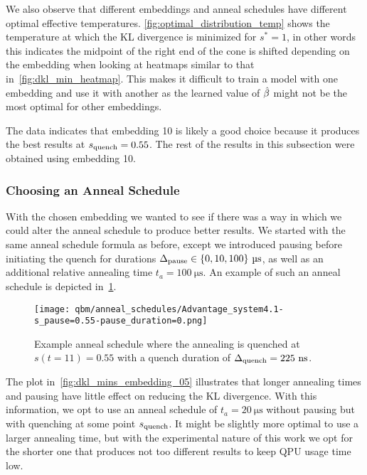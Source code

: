 We also observe that different embeddings and anneal schedules have different optimal effective temperatures.
\cref{fig:optimal_distribution_temp} shows the temperature at which the KL divergence is minimized for \( s^* = 1 \), in other words this indicates the midpoint of the right end of the cone is shifted depending on the embedding when looking at heatmaps similar to that in~\cref{fig:dkl_min_heatmap}.
This makes it difficult to train a model with one embedding and use it with another as the learned value of \( \hat{\beta} \) might not be the most optimal for other embeddings.

The data indicates that embedding 10 is likely a good choice because it produces the best results at \( s_{\text{quench}} = 0.55 \).
The rest of the results in this subsection were obtained using embedding 10.

\subsubsection{Choosing an Anneal Schedule}\label{sec:choosing_an_anneal_schedule}
With the chosen embedding we wanted to see if there was a way in which we could alter the anneal schedule to produce better results.
We started with the same anneal schedule formula as before, except we introduced pausing before initiating the quench for durations \( \Deltapause \in \{ 0, 10, 100 \} \ \si{\micro\second} \), as well as an additional relative annealing time \( t_a = 100 \ \si{\micro\second} \).
An example of such an anneal schedule is depicted in~\cref{fig:anneal_schedule_example}.
\begin{figure}[!htb]
    \begin{center}
        \texttt{[image: qbm/anneal\_schedules/Advantage\_system4.1-s\_pause=0.55-pause\_duration=0.png]}
    \end{center}
    \caption{Example anneal schedule where the annealing is quenched at \( s(t = 11) = 0.55 \) with a quench duration of \( \Delta_{\text{quench}} = 225 \ \si{\nano\second} \).}
    \label{fig:anneal_schedule_example}
\end{figure}

The plot in~\cref{fig:dkl_mins_embedding_05} illustrates that longer annealing times and pausing have little effect on reducing the KL divergence.
With this information, we opt to use an anneal schedule of \( t_a = 20 \ \si{\micro\second} \) without pausing but with quenching at some point \( s_{\text{quench}} \).
It might be slightly more optimal to use a larger annealing time, but with the experimental nature of this work we opt for the shorter one that produces not too different results to keep QPU usage time low.

